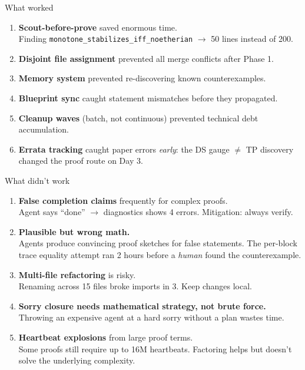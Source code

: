 \documentclass[aspectratio=169,10pt]{beamer}
\begin{document}
\begin{frame}{What worked}
    \vspace{-0.4em}
    \begin{enumerate}
        \item \textcolor{leangreen}{\textbf{Scout-before-prove}} saved enormous time.\\ {\footnotesize Finding \texttt{monotone\_stabilizes\_iff\_noetherian} $\to$ 50 lines instead of 200.}
        \item \textcolor{leangreen}{\textbf{Disjoint file assignment}} prevented all merge conflicts after Phase 1.
        \item \textcolor{leangreen}{\textbf{Memory system}} prevented re-discovering known counterexamples.
        \item \textcolor{leangreen}{\textbf{Blueprint sync}} caught statement mismatches before they propagated.
        \item \textcolor{leangreen}{\textbf{Cleanup waves}} (batch, not continuous) prevented technical debt accumulation.
        \item \textcolor{leangreen}{\textbf{Errata tracking}} caught paper errors \emph{early}: the DS gauge $\neq$ TP discovery changed the proof route on Day 3.
    \end{enumerate}
\end{frame}

\begin{frame}{What didn't work}
    \vspace{-0.4em}
    \begin{enumerate}
        \item \textcolor{softred}{\textbf{False completion claims}} frequently for complex proofs.\\ {\footnotesize Agent says ``done'' $\to$ diagnostics shows 4 errors. Mitigation: always verify.}
        \item \textcolor{softred}{\textbf{Plausible but wrong math.}}\\ {\footnotesize Agents produce convincing proof sketches for false statements. The per-block trace equality attempt ran 2 hours before a \emph{human} found the counterexample.}
        \item \textcolor{softred}{\textbf{Multi-file refactoring}} is risky.\\ {\footnotesize Renaming across 15 files broke imports in 3. Keep changes local.}
        \item \textcolor{amber}{\textbf{Sorry closure needs mathematical strategy, not brute force.}}\\ {\footnotesize Throwing an expensive agent at a hard sorry without a plan wastes time.}
        \item \textcolor{amber}{\textbf{Heartbeat explosions}} from large proof terms.\\ {\footnotesize Some proofs still require up to 16M heartbeats. Factoring helps but doesn't solve the underlying complexity.}
    \end{enumerate}
\end{frame}
\end{document}

